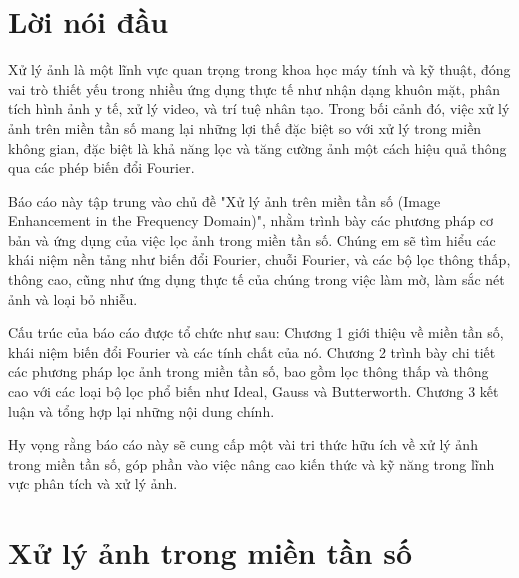 \documentclass[12pt,a4paper]{report}
\numberwithin{equation}{section}
\theoremstyle{definition} %
\begin{document}
	\chapter*{Lời nói đầu}
	\thispagestyle{fancy}
	\renewcommand{\baselinestretch}{1.2}

	\indent
	Xử lý ảnh là một lĩnh vực quan trọng trong khoa học máy tính và kỹ thuật, đóng vai trò thiết yếu trong nhiều ứng dụng thực tế như nhận dạng khuôn mặt, phân tích hình ảnh y tế, xử lý video, và trí tuệ nhân tạo. Trong bối cảnh đó, việc xử lý ảnh trên miền tần số mang lại những lợi thế đặc biệt so với xử lý trong miền không gian, đặc biệt là khả năng lọc và tăng cường ảnh một cách hiệu quả thông qua các phép biến đổi Fourier.

	Báo cáo này tập trung vào chủ đề "Xử lý ảnh trên miền tần số (Image Enhancement in the Frequency Domain)", nhằm trình bày các phương pháp cơ bản và ứng dụng của việc lọc ảnh trong miền tần số. Chúng em sẽ tìm hiểu các khái niệm nền tảng như biến đổi Fourier, chuỗi Fourier, và các bộ lọc thông thấp, thông cao, cũng như ứng dụng thực tế của chúng trong việc làm mờ, làm sắc nét ảnh và loại bỏ nhiễu.

	Cấu trúc của báo cáo được tổ chức như sau: Chương 1 giới thiệu về miền tần số, khái niệm biến đổi Fourier và các tính chất của nó. Chương 2 trình bày chi tiết các phương pháp lọc ảnh trong miền tần số, bao gồm lọc thông thấp và thông cao với các loại bộ lọc phổ biến như Ideal, Gauss và Butterworth. Chương 3 kết luận và tổng hợp lại những nội dung chính.

	Hy vọng rằng báo cáo này sẽ cung cấp một vài tri thức hữu ích về xử lý ảnh trong miền tần số, góp phần vào việc nâng cao kiến thức và kỹ năng trong lĩnh vực phân tích và xử lý ảnh.




	\rightline{\textbf{}\hspace*{0.9cm}}

	
	
	\newpage
	\renewcommand{\baselinestretch}{1.2}
	

\chapter{\centering Xử lý ảnh trong miền tần số}
\end{document}
